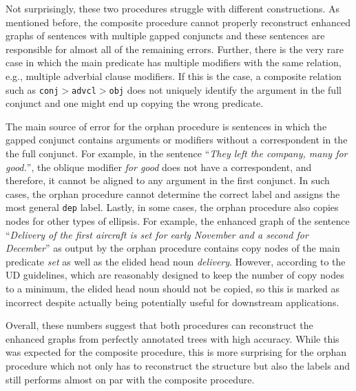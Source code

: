 \documentclass[lucida,biblatex]{sp} %
\begin{document}
Not surprisingly, these two procedures struggle with different constructions. As mentioned before, the {\sc composite} procedure cannot properly reconstruct enhanced graphs of sentences with multiple gapped conjuncts and these sentences are responsible for almost all of the remaining errors. Further, there is the very rare case in which the main predicate has multiple modifiers with the same relation, e.g., multiple adverbial clause modifiers. If this is the case, a composite relation such as {\tt conj$>$advcl$>$obj} does not uniquely identify the argument in the full conjunct and one might end up copying the wrong predicate.

The main source of error for the {\sc orphan} procedure is sentences in which the gapped conjunct contains arguments or modifiers without a correspondent in the the full conjunct. For example, in the sentence ``{\it They left the company, many for good.}'', the oblique modifier {\it for good} does not have a correspondent, and therefore, it cannot be aligned to any argument in the first conjunct. In such cases, the  {\sc orphan} procedure cannot determine the correct label and assigns the most general {\tt dep} label. Lastly, in some cases, the {\sc orphan} procedure also copies nodes for other types of ellipsis. For example, the enhanced graph of the sentence ``{\it Delivery of the first aircraft is set for early November and a second for December}'' as output by the {\sc orphan} procedure contains copy nodes of the main predicate {\it set} as well as the elided head noun {\it delivery}. However, according to the UD guidelines, which are reasonably designed to keep the number of copy nodes to a minimum, the elided head noun should not be copied, so this is marked as incorrect despite actually being potentially useful for downstream applications.


Overall, these numbers suggest that both procedures can reconstruct the enhanced graphs from perfectly annotated trees with high accuracy. While this was expected for the {\sc composite} procedure, this is more surprising for the {\sc orphan} procedure which not only has to reconstruct the structure but also the labels and still performs almost on par with the {\sc composite} procedure.
\end{document}
